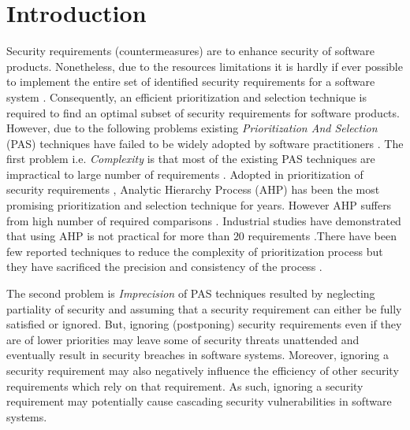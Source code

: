 \section{Introduction}
\label{introduction}
Security requirements (countermeasures) are to enhance security of software products. Nonetheless, due to the resources limitations it is hardly if ever possible to implement the entire set of identified security requirements for a software system \cite{loer2006integrated}. Consequently, an efficient prioritization and selection technique is required to find an optimal subset of security requirements for software products\cite{roy2012scalable,tonella2013interactive}. However, due to the following problems existing \textit{Prioritization And Selection} (PAS) techniques \cite{laurent2007towards,buyukozkan2005group,wiegers1999first,karlsson1997managing,karlsson1996software,karlsson1997cost,mohamed2008towards} have failed to be widely adopted by software practitioners \cite{ejnioui2012software,herrmann2008requirements}. The first problem i.e. \textit{Complexity} is that most of the existing PAS techniques are impractical to large number of requirements \cite{roy2012scalable,ejnioui2012software,berander2005requirements}. Adopted in prioritization of security requirements \cite{karlsson1998evaluation,mead2006identifying}, Analytic Hierarchy Process (AHP) has been the most promising \cite{karlsson1998evaluation} prioritization and selection technique \cite{ejnioui2012software} for years. However AHP suffers from high number of required comparisons \cite{karlsson1998evaluation}. Industrial studies have demonstrated that using AHP is not practical for more than $20$ requirements \cite{lehtola2004empirical}.There have been few reported techniques \cite{ejnioui2012software,berander2005requirements} to reduce the complexity of prioritization process but they have sacrificed the precision and consistency of the process \cite{ejnioui2012software}. 

The second problem is \textit{Imprecision} of PAS techniques \cite{ejnioui2012software} resulted by neglecting partiality of security and assuming that a security requirement can either be fully satisfied or ignored. But, ignoring (postponing) security requirements even if they are of lower priorities may leave some of security threats unattended and eventually result in security breaches in software systems. Moreover, ignoring a security requirement may also negatively influence the efficiency of other security requirements which rely on that requirement. As such, ignoring a security requirement may potentially cause cascading security vulnerabilities in software systems. 

